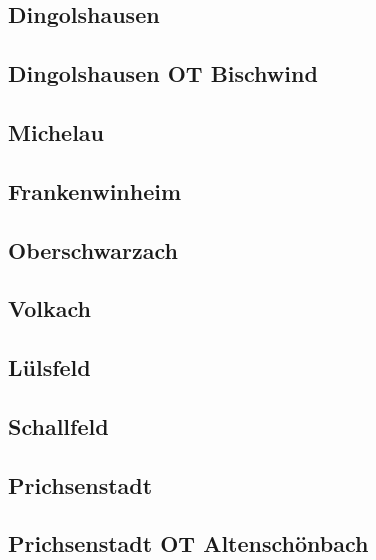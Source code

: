 \documentclass[fontsize=12pt,a4paper]{scrreprt}
\begin{document}
\subsection{Dingolshausen}


\subsection{Dingolshausen OT Bischwind}


\subsection{Michelau}


\subsection{Frankenwinheim}


\subsection{Oberschwarzach}


\subsection{Volkach}


\subsection{Lülsfeld}


\subsection{Schallfeld}


\subsection{Prichsenstadt}


\subsection{Prichsenstadt OT Altenschönbach}

\end{document}
